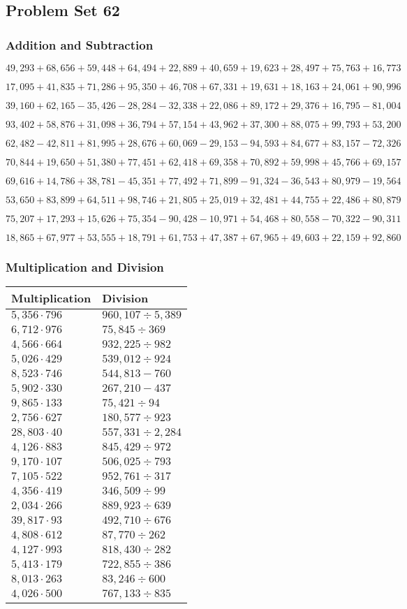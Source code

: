 \hypertarget{problem-set-62}{%
\subsection{Problem Set 62}\label{problem-set-62}}

\hypertarget{addition-and-subtraction-284}{%
\subsubsection{Addition and
Subtraction}\label{addition-and-subtraction-284}}

\(49,293+68,656+59,448+64,494+22,889+40,659+19,623+28,497+75,763+ 16,773\)

\(17,095+41,835+71,286+95,350+46,708+67,331+19,631+18,163+24,061+90,996\)

\(39,160+62,165-35,426-28,284-32,338+22,086+89,172+29,376+16,795-81,004\)

\(93,402+58,876+31,098+36,794+57,154+43,962+37,300+88,075+99,793+53,200\)

\(62,482-42,811+81,995+28,676+60,069-29,153-94,593+84,677+83,157-72,326\)

\(70,844+19,650+51,380+77,451+62,418+69,358+70,892+59,998+45,766+69,157\)

\(69,616+14,786+38,781-45,351+77,492+71,899-91,324-36,543+80,979-19,564\)

\(53,650+83,899+64,511+98,746+21,805+25,019+32,481+44,755+22,486+80,879\)

\(75,207+17,293+15,626+75,354-90,428-10,971+54,468+80,558-70,322-90,311\)

\(18,865+67,977+53,555+18,791+61,753+47,387+67,965+49,603+22,159+92,860\)

\hypertarget{multiplication-and-division-283}{%
\subsubsection{Multiplication and
Division}\label{multiplication-and-division-283}}

\begin{longtable}[]{@{}ll@{}}
\toprule
Multiplication & Division\tabularnewline
\midrule
\endhead
\(5,356\cdot796\) & \(960,107÷5,389\)\tabularnewline
\(6,712\cdot976\) & \(75,845÷369\)\tabularnewline
\(4,566\cdot664\) & \(932,225÷982\)\tabularnewline
\(5,026\cdot429\) & \(539,012÷924\)\tabularnewline
\(8,523\cdot746\) & \(544,813 - 760\)\tabularnewline
\(5,902\cdot330\) & \(267,210 - 437\)\tabularnewline
\(9,865\cdot133\) & \(75,421÷94\)\tabularnewline
\(2,756\cdot627\) & \(180,577÷923\)\tabularnewline
\(28,803\cdot40\) & \(557,331÷2,284\)\tabularnewline
\(4,126\cdot883\) & \(845,429÷972\)\tabularnewline
\(9,170\cdot107\) & \(506,025÷793\)\tabularnewline
\(7,105\cdot522\) & \(952,761÷317\)\tabularnewline
\(4,356\cdot419\) & \(346,509÷99\)\tabularnewline
\(2,034\cdot266\) & \(889,923÷639\)\tabularnewline
\(39,817\cdot93\) & \(492,710÷676\)\tabularnewline
\(4,808\cdot612\) & \(87,770÷262\)\tabularnewline
\(4,127\cdot993\) & \(818,430÷282\)\tabularnewline
\(5,413\cdot179\) & \(722,855÷386\)\tabularnewline
\(8,013\cdot263\) & \(83,246÷600\)\tabularnewline
\(4,026\cdot500\) & \(767,133÷835\)\tabularnewline
\bottomrule
\end{longtable}

